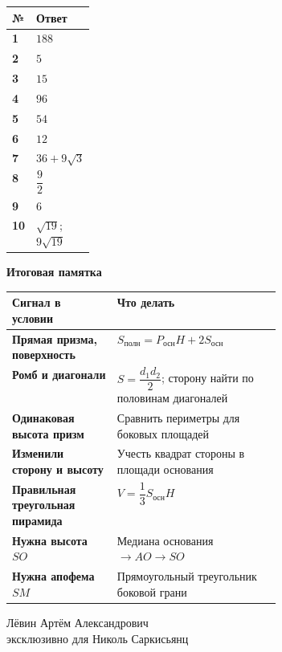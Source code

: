 \documentclass[a4paper,11pt]{article}
\newcommand{\smhead}[1]{\medskip\textbf{\color{darkaccent}#1}\par}
\begin{document}
\begin{center}
\renewcommand{\arraystretch}{1.35}
\begin{tabularx}{0.88\linewidth}{@{}>{\bfseries}p{0.12\linewidth}X@{}}
\toprule
№ & Ответ \\
\midrule
1 & $188$ \\
2 & $5$ \\
3 & $15$ \\
4 & $96$ \\
5 & $54$ \\
6 & $12$ \\
7 & $36+9\sqrt3$ \\
8 & $\dfrac92$ \\
9 & $6$ \\
10 & $\sqrt{19}$; $9\sqrt{19}$ \\
\bottomrule
\end{tabularx}
\end{center}
\vspace{13mm}
\smhead{Итоговая памятка}
\begin{tabularx}{\linewidth}{@{}>{\bfseries}p{0.39\linewidth}X@{}}
\toprule
Сигнал в условии & Что делать \\
\midrule
Прямая призма, поверхность & $S_{\text{полн}}=P_{\text{осн}}H+2S_{\text{осн}}$ \\
Ромб и диагонали & $S=\dfrac{d_1d_2}{2}$; сторону найти по половинам диагоналей \\
Одинаковая высота призм & Сравнить периметры для боковых площадей \\
Изменили сторону и высоту & Учесть квадрат стороны в площади основания \\
Правильная треугольная пирамида & $V=\dfrac13S_{\text{осн}}H$ \\
Нужна высота $SO$ & Медиана основания $\to AO\to SO$ \\
Нужна апофема $SM$ & Прямоугольный треугольник боковой грани \\
\bottomrule
\end{tabularx}
\vfill
\begin{center}\small\color{muted}
Лёвин Артём Александрович\\[-1pt]
эксклюзивно для Николь Саркисьянц
\end{center}
\end{document}
